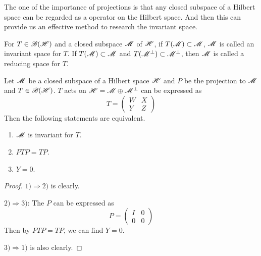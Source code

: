 \documentclass[a4paper,11pt]{report}
\begin{document}
The one of the importance of projections is that any closed subspace of a Hilbert space can be regarded as a operator on the Hilbert space. And then this can provide us an effective method to research the invariant space.

\begin{defn}
	For $T \in \mathscr{B(H)}$ and a closed subspace $\mathscr{M}$ of $\mathscr{H}$, if $T(\mathscr{M}) \subset \mathscr{M}$, $\mathscr{M}$ is called an invariant space for $T$. If $T(\mathscr{M}) \subset \mathscr{M}$ and $T(\mathscr{M}^{\bot}) \subset \mathscr{M}^{\bot}$, then $\mathscr{M}$ is called a reducing space for $T$.
\end{defn}

\begin{prop}
	Let $\mathscr{M}$ be a closed subspace of a Hilbert space $\mathscr{H}$ and $P$ be the projection to $\mathscr{M}$ and $T \in \mathscr{B(H)}$. $T$ acts on $\mathscr{H}=\mathscr{M} \oplus \mathscr{M}^{\bot}$ can be expressed as
	\begin{equation*}
		T = \left(
			\begin{array}{cc}
				W & X \\
				Y & Z
			\end{array}
		\right)
	\end{equation*}
 	Then the following statements are equivalent.
	\begin{enumerate}[label=\arabic*)]
		\item $\mathscr{M}$ is invariant for $T$.
		\item $PTP=TP$.
		\item $Y=0$.
	\end{enumerate}
\end{prop}
\begin{proof}
	$1) \Rightarrow 2)$ is clearly.
	\item $2) \Rightarrow 3)$: The $P$ can be expressed as
	\begin{equation*}
		P = \left(
			\begin{array}{cc}
				I & 0 \\
				0 & 0
			\end{array}
		\right)
	\end{equation*}
	Then by $PTP=TP$, we can find $Y=0$.
	\item $3) \Rightarrow 1)$ is also clearly.
\end{proof}
\end{document}
